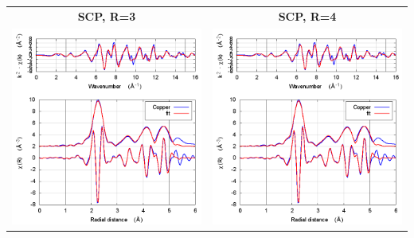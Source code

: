 \documentclass[11pt]{article}
\begin{document}
\begin{center}
  \begin{tabular}{cc}
    \textbf{SCP, R=3} & \textbf{SCP, R=4} \\
    \includegraphics[width=.45\linewidth]{Copper/scf/fit_withSCF_3.png} &
    \includegraphics[width=.45\linewidth]{Copper/scf/fit_withSCF_4.png} \\
  \end{tabular}
\end{center}
\end{document}
